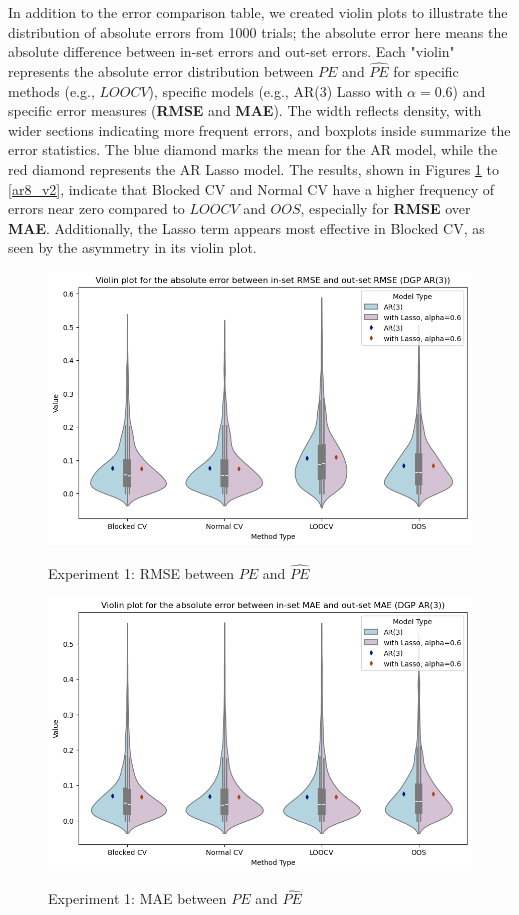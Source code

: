 \documentclass[12pt, oneside]{amsart}
\theoremstyle{definition}
\theoremstyle{remark}
\numberwithin{equation}{section}
\begin{document}
In addition to the error comparison table, we created violin plots to illustrate the distribution of absolute errors from 1000 trials; the absolute error here means the absolute difference between in-set errors and out-set errors. Each "violin" represents the absolute error distribution between $PE$ and $\hat{PE}$ for specific methods (e.g., $LOOCV$), specific models (e.g., AR(3) Lasso with $\alpha = 0.6$) and specific error measures (\textbf{RMSE} and \textbf{MAE}). The width reflects density, with wider sections indicating more frequent errors, and boxplots inside summarize the error statistics. The blue diamond marks the mean for the AR model, while the red diamond represents the AR Lasso model. The results, shown in Figures \ref{ar3_v1} to \ref{ar8_v2}, indicate that Blocked CV and Normal CV have a higher frequency of errors near zero compared to $LOOCV$ and $OOS$, especially for \textbf{RMSE} over \textbf{MAE}. Additionally, the Lasso term appears most effective in Blocked CV, as seen by the asymmetry in its violin plot.

\begin{figure}[hbt!]
    \caption{Experiment 1: RMSE between $PE$ and $\hat{PE}$}
    \centering
    \includegraphics[scale=0.5]{Report/Figures/ar3_violin_rmse.jpg}
    \label{ar3_v1}
\end{figure}
\FloatBarrier

\begin{figure}[hbt!]
    \caption{Experiment 1: MAE between $PE$ and $\hat{PE}$}
    \centering
    \includegraphics[scale=0.5]{Report/Figures/ar3_violin_mae.jpg}
    \label{ar3_v2}
\end{figure}
\FloatBarrier
\end{document}
